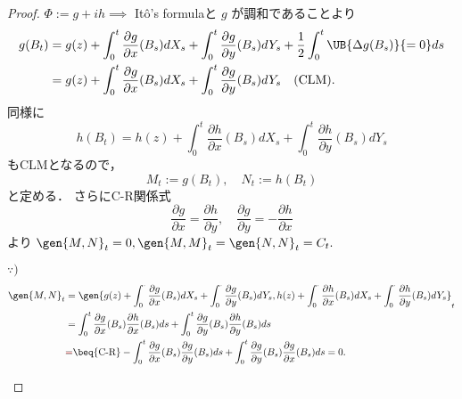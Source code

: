 \documentclass{jsarticle}
\newcommand\erase{\bgroup\markoverwith{\textcolor{red}{\rule[.5ex]{2pt}{0.4pt}}}\ULon} %
\providecommand{\DIFdel}[1]{{\protect\erase{#1}}}               %
\providecommand{\DIFaddbegin}{} %
\providecommand{\DIFaddend}{} %
\providecommand{\DIFdelbegin}{} %
\providecommand{\DIFdelend}{} %
\begin{document}
\begin{proof}
    $\Phi:=g+ih\implies $ It\^{o}'s formulaと $g$ が調和であることより
    \begin{align}
        g(B_t)
        &= g(z)
        + \int_0^t\frac{\partial g}{\partial x}(B_s)dX_s
        + \int_0^t\frac{\partial g}{\partial y}(B_s)dY_s
        + \frac{1}{2}\int_0^t\UB{\Delta g(B_s)}{=0}ds \\
        &= g(z)
        + \int_0^t\frac{\partial g}{\partial x}(B_s)dX_s
        + \int_0^t\frac{\partial g}{\partial y}(B_s)dY_s
        \quad\text{(CLM)}.
    \end{align}
    同様に
    $$
    h(B_t)
    =h(z)
    + \int_0^t\frac{\partial h}{\partial x}(B_s)dX_s
    + \int_0^t\frac{\partial h}{\partial y}(B_s)dY_s
    $$
    もCLMとなるので，
    $$
    M_t:= g(B_t), \quad
    N_t:= h(B_t)
    $$
    と定める．
    さらにC-R関係式
    $$
    \frac{\partial g}{\partial x} = \frac{\partial h}{\partial y},\quad
    \frac{\partial g}{\partial y} = -\frac{\partial h}{\partial x}
    $$
    より $\gen{M, N}_t=0, \gen{M, M}_t=\gen{N, N}_t=C_t.$

    \begin{screen}
        $\because)$
        \begin{align}
            \gen{M, N}_t
            &= \gen{g(z)+\int_0^{\cdot}\frac{\partial g}{\partial x}(B_s)dX_s+\int_0^{\cdot}\frac{\partial g}{\partial y}(B_s)dY_s,
            h(z)+\int_0^{\cdot}\frac{\partial h}{\partial x}(B_s)dX_s+\int_0^{\cdot}\frac{\partial h}{\partial y}(B_s)dY_s}_t \\
            &= \int_0^t\frac{\partial g}{\partial x}(B_s)\frac{\partial h}{\partial x}(B_s)ds
            + \int_0^t\frac{\partial g}{\partial y}(B_s)\frac{\partial h}{\partial y}(B_s)ds \\
            &\DIFdelbegin \DIFdel{= }\DIFdelend \DIFaddbegin \beq{\text{C-R}} \DIFaddend -\int_0^t\frac{\partial g}{\partial x}(B_s)\frac{\partial g}{\partial y}(B_s)ds
            + \int_0^t\frac{\partial g}{\partial y}(B_s)\frac{\partial g}{\partial x}(B_s)ds = 0.
        \end{align}


\end{screen}
\end{proof}
\end{document}
